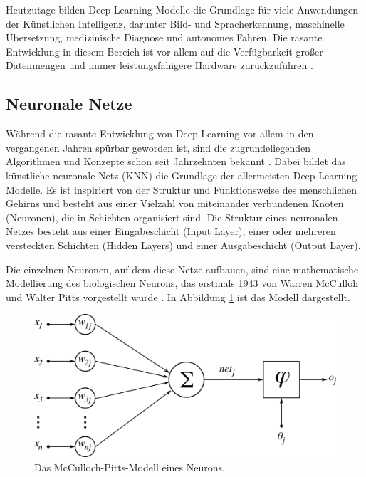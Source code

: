 Heutzutage bilden Deep Learning-Modelle die Grundlage für viele Anwendungen der Künstlichen Intelligenz, darunter Bild- und Spracherkennung, maschinelle Übersetzung, medizinische Diagnose und autonomes Fahren. Die rasante Entwicklung in diesem Bereich ist vor allem auf die Verfügbarkeit großer Datenmengen und immer leistungsfähigere Hardware zurückzuführen \parencite{Goodfellow2016deeplearning}. %

\subsection{Neuronale Netze} \label{sec:neural-networks}

Während die rasante Entwicklung von Deep Learning vor allem in den vergangenen Jahren spürbar geworden ist, sind die zugrundeliegenden Algorithmen und Konzepte schon seit Jahrzehnten bekannt \parencite{Zhou2021machinelearning}. Dabei bildet das künstliche neuronale Netz (KNN) die Grundlage der allermeisten Deep-Learning-Modelle. Es ist inspiriert von der Struktur und Funktionsweise des menschlichen Gehirns und besteht aus einer Vielzahl von miteinander verbundenen Knoten (Neuronen), die in Schichten organisiert sind. Die Struktur eines neuronalen Netzes besteht aus einer Eingabeschicht (Input Layer), einer oder mehreren versteckten Schichten (Hidden Layers) und einer Ausgabeschicht (Output Layer). %


Die einzelnen Neuronen, auf dem diese Netze aufbauen, sind eine mathematische Modellierung des biologischen Neurons, das erstmals 1943 von Warren McCulloh und Walter Pitts vorgestellt wurde \parencite{Zhou2021machinelearning}. In Abbildung \ref{fig:neuron} ist das Modell dargestellt.

\begin{figure}[h]
	\centering
	\vspace*{4mm}
	\includegraphics[width=12cm]{figure_mp-neuron_nd.png} %
	\vspace*{2mm}
	\caption{Das McCulloch-Pitts-Modell eines Neurons.}
	\label{fig:neuron}
\end{figure}

